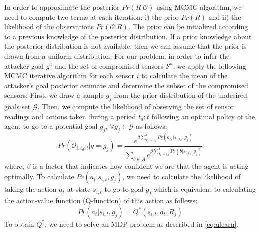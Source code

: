 \documentclass[letterpaper, 10 pt, conference]{ieeeconf}  %
\newcommand\NB[1]{$\spadesuit$\footnote{NB: #1}}
\begin{document}
In order to approximate the posterior $Pr(R|\mathcal{O})$ using MCMC algorithm, we need to compute two terms at each iteration: i) the prior $Pr(R)$ and ii) the likelihood of the observations $Pr(\mathcal{O}|R)$.
The prior can be initialized according to a previous knowledge of the posterior distribution. If a prior knowledge about the posterior distribution is not available, then we can assume that the prior is drawn from a uniform distribution.
For our problem, in order to infer the attacker goal $g^a$ and the set of compromised sensors $\mathcal{S}^a$, we apply the following MCMC iterative algorithm for each sensor $i$ to calculate the mean of the attacker's goal posterior estimate and determine the subset of the compromised sensors: %
First, we draw a sample $g_j$ from the prior distribution of the undesired goals set $\mathcal{G}$. Then, we compute the likelihood of observing the set of sensor readings and actions taken during a period $t_d:t$ following an optimal policy of the agent to go to a potential goal $g_j$, $\forall g_j \in \mathcal G$ as follows:
\begin{equation}\label{eq:likelihood}
Pr(\mathcal{O}_{i,t_d:t} | g = g_j)  = \frac{e^{\beta\sum_{t_k = t_d}^{t}{ Pr(a_{t_k}|s_{i,t_k},g_j)}}}{\sum_{b\in A}{}e^{\beta\sum_{t_k=t_d}^{t} Pr(b|s_{i,t_k},g_j)}}
\end{equation}
where, $\beta$ is a factor that indicates how confident we are that the agent is acting optimally. To calculate $Pr(a_t|s_{i,t},g_j)$,  we need to calculate the likelihood of taking the action $a_t$ at state $s_{i,t}$ to go to goal $g_j$ which is equivalent to calculating the action-value function (Q-function) of this action as follows:
\begin{equation} Pr(a_t|s_{i,t},g_j) = Q^*(s_{i,t},a_t,R_j)
\label{eqn:action_likelihood}
\end{equation}
To obtain $Q^*$, we need to solve an MDP problem as described in \eqref{eq:qlearn}.%




%
\end{document}
